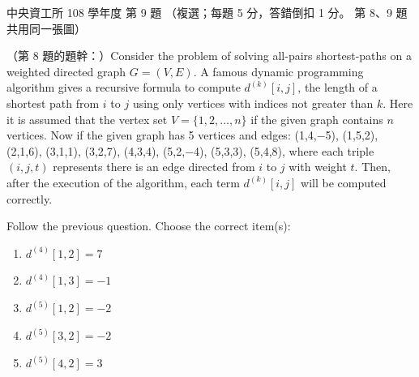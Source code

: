 \begin{pastexam}[label={px:ncu-108-dsa-09}]{中央資工所 108 學年度 第 9 題}
（複選；每題 5 分，答錯倒扣 1 分。 第 8、9 題共用同一張圖）

（第 8 題的題幹：）Consider the problem of solving all-pairs shortest-paths on a weighted directed graph $G = (V, E)$. A
famous dynamic programming algorithm gives a recursive formula to compute $d^{(k)}[i, j]$, the length
of a shortest path from $i$ to $j$ using only vertices with indices not greater than $k$. Here it is
assumed that the vertex set $V = \{1, 2, \ldots, n\}$ if the given graph contains $n$ vertices. Now if
the given graph has 5 vertices and edges: (1,4,$-$5), (1,5,2), (2,1,6), (3,1,1), (3,2,7), (4,3,4),
(5,2,$-$4), (5,3,3), (5,4,8), where each triple $(i, j, t)$ represents there is an edge directed from
$i$ to $j$ with weight $t$. Then, after the execution of the algorithm, each term $d^{(k)}[i, j]$ will
be computed correctly.

Follow the previous question. Choose the correct item(s):
\begin{enumerate}[label=(\Alph*)]
\item $d^{(4)}[1,2] = 7$
\item $d^{(4)}[1,3] = -1$
\item $d^{(5)}[1,2] = -2$
\item $d^{(5)}[3,2] = -2$
\item $d^{(5)}[4,2] = 3$
\end{enumerate}
\end{pastexam}

